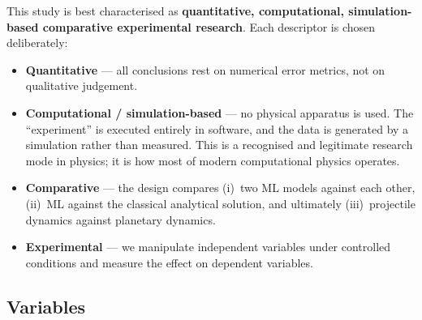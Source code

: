 \documentclass[11pt,a4paper]{article}
\begin{document}
This study is best characterised as \textbf{quantitative, computational, simulation-based
comparative experimental research}. Each descriptor is chosen deliberately:

\begin{itemize}[leftmargin=2em,itemsep=0.15em]
  \item \textbf{Quantitative} --- all conclusions rest on numerical error metrics, not on
        qualitative judgement.
  \item \textbf{Computational / simulation-based} --- no physical apparatus is used. The
        ``experiment'' is executed entirely in software, and the data is generated by a simulation
        rather than measured. This is a recognised and legitimate research mode in physics; it is
        how most of modern computational physics operates.
  \item \textbf{Comparative} --- the design compares (i)~two ML models against each other,
        (ii)~ML against the classical analytical solution, and ultimately (iii)~projectile dynamics
        against planetary dynamics.
  \item \textbf{Experimental} --- we manipulate independent variables under controlled conditions
        and measure the effect on dependent variables.
\end{itemize}

\subsection{Variables}
\end{document}
